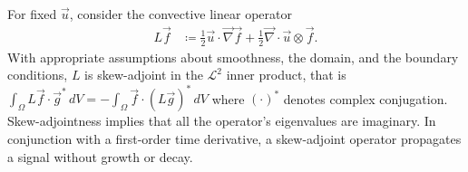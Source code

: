 \documentclass[letterpaper,reqno,11pt]{amsart}
\newcommand{\vecnabla}{\ensuremath{\vec{\nabla}}}
\begin{document}
For fixed $\vec{u}$, consider the convective linear operator
\begin{align}
  L\vec{f} &\coloneqq
      \frac{1}{2}\vec{u}\cdot\vecnabla{}\vec{f}
    + \frac{1}{2}\vecnabla\cdot\vec{u}\otimes\vec{f}.
\end{align}
With appropriate assumptions about smoothness, the domain, and the boundary
conditions, $L$ is skew-adjoint in the $\mathcal{L}^2$ inner product, that is $
\int_{\Omega} L\vec{f}\cdot\vec{g}^{\ast}\,d\!V = -\int_{\Omega}
\vec{f}\cdot{}\left(L\vec{g}\right)^{\ast} \,d\!V$ where
$\left(\cdot\right)^\ast$ denotes complex conjugation.  Skew-adjointness
implies that all the operator's eigenvalues are imaginary.  In conjunction with
a first-order time derivative, a skew-adjoint operator propagates a signal
without growth or decay.

\end{document}
